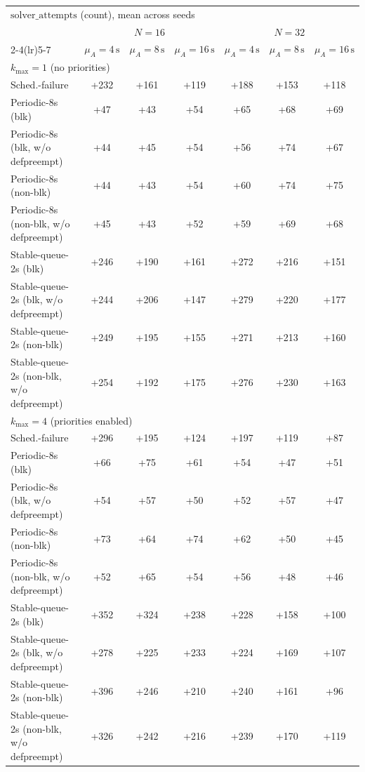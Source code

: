 \begin{tabular}{l c c c c c c}
\toprule
\multicolumn{7}{l}{$\mathbf{\mathrm{solver\_attempts}}$ (count), mean across seeds} \\
\addlinespace[0.2em]
& \multicolumn{3}{c}{$N=16$} & \multicolumn{3}{c}{$N=32$} \\
\cmidrule(lr){2-4}\cmidrule(lr){5-7}
& $\mu_A{=}4\,\mathrm{s}$ & $\mu_A{=}8\,\mathrm{s}$ & $\mu_A{=}16\,\mathrm{s}$ & $\mu_A{=}4\,\mathrm{s}$ & $\mu_A{=}8\,\mathrm{s}$ & $\mu_A{=}16\,\mathrm{s}$ \\
\midrule
\multicolumn{7}{l}{$k_{\max}=1$ (no priorities)} \\
\midrule
Sched.-failure & +232 & +161 & +119 & +188 & +153 & +118 \\
Periodic-8s (blk) & +47 & +43 & +54 & +65 & +68 & +69 \\
Periodic-8s (blk, w/o defpreempt) & +44 & +45 & +54 & +56 & +74 & +67 \\
Periodic-8s (non-blk) & +44 & +43 & +54 & +60 & +74 & +75 \\
Periodic-8s (non-blk, w/o defpreempt) & +45 & +43 & +52 & +59 & +69 & +68 \\
Stable-queue-2s (blk) & +246 & +190 & +161 & +272 & +216 & +151 \\
Stable-queue-2s (blk, w/o defpreempt) & +244 & +206 & +147 & +279 & +220 & +177 \\
Stable-queue-2s (non-blk) & +249 & +195 & +155 & +271 & +213 & +160 \\
Stable-queue-2s (non-blk, w/o defpreempt) & +254 & +192 & +175 & +276 & +230 & +163 \\
\midrule
\multicolumn{7}{l}{$k_{\max}=4$ (priorities enabled)} \\
\midrule
Sched.-failure & +296 & +195 & +124 & +197 & +119 & +87 \\
Periodic-8s (blk) & +66 & +75 & +61 & +54 & +47 & +51 \\
Periodic-8s (blk, w/o defpreempt) & +54 & +57 & +50 & +52 & +57 & +47 \\
Periodic-8s (non-blk) & +73 & +64 & +74 & +62 & +50 & +45 \\
Periodic-8s (non-blk, w/o defpreempt) & +52 & +65 & +54 & +56 & +48 & +46 \\
Stable-queue-2s (blk) & +352 & +324 & +238 & +228 & +158 & +100 \\
Stable-queue-2s (blk, w/o defpreempt) & +278 & +225 & +233 & +224 & +169 & +107 \\
Stable-queue-2s (non-blk) & +396 & +246 & +210 & +240 & +161 & +96 \\
Stable-queue-2s (non-blk, w/o defpreempt) & +326 & +242 & +216 & +239 & +170 & +119 \\
\bottomrule
\end{tabular}

